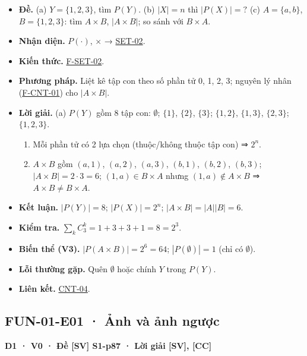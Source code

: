 \documentclass[
  10pt,
  twoside,openany]{book}
\providecommand{\tightlist}{%
  \setlength{\itemsep}{0pt}\setlength{\parskip}{0pt}}
\begin{document}
\begin{itemize}
\tightlist
\item
  \textbf{Đề.} (a) \(Y=\{1,2,3\}\), tìm \(P(Y)\). (b) \(|X|=n\) thì
  \(|P(X)|=?\) (c) \(A=\{a,b\}\), \(B=\{1,2,3\}\): tìm \(A\times B\),
  \(|A\times B|\); so sánh với \(B\times A\).
\item
  \textbf{Nhận diện.} \(P(\cdot)\), \(\times\) →
  \protect\hyperlink{SET-02}{SET-02}.
\item
  \textbf{Kiến thức.} \protect\hyperlink{F-SET-02}{F-SET-02}.
\item
  \textbf{Phương pháp.} Liệt kê tập con theo số phần tử 0, 1, 2, 3;
  nguyên lý nhân (\protect\hyperlink{F-CNT-01}{F-CNT-01}) cho
  \(|A\times B|\).
\item
  \textbf{Lời giải.} (a) \(P(Y)\) gồm 8 tập con: \(\emptyset\);
  \(\{1\}\), \(\{2\}\), \(\{3\}\); \(\{1,2\}\), \(\{1,3\}\),
  \(\{2,3\}\); \(\{1,2,3\}\).

  \begin{enumerate}
  \def\labelenumi{(\alph{enumi})}
  \setcounter{enumi}{1}
  \tightlist
  \item
    Mỗi phần tử có 2 lựa chọn (thuộc/không thuộc tập con) ⇒ \(2^n\).
  \item
    \(A\times B\) gồm \((a,1)\), \((a,2)\), \((a,3)\), \((b,1)\),
    \((b,2)\), \((b,3)\); \(|A\times B|=2\cdot3=6\);
    \((1,a)\in B\times A\) nhưng \((1,a)\notin A\times B\) ⇒
    \(A\times B\ne B\times A\).
  \end{enumerate}
\item
  \textbf{Kết luận.} \(|P(Y)|=8\); \(|P(X)|=2^n\);
  \(|A\times B|=|A||B|=6\).
\item
  \textbf{Kiểm tra.} \(\sum_k C_3^k=1+3+3+1=8=2^3\).
\item
  \textbf{Biến thể (V3).} \(|P(A\times B)|=2^{6}=64\);
  \(|P(\emptyset)|=1\) (chỉ có \(\emptyset\)).
\item
  \textbf{Lỗi thường gặp.} Quên \(\emptyset\) hoặc chính \(Y\) trong
  \(P(Y)\).
\item
  \textbf{Liên kết.} \protect\hyperlink{CNT-04}{CNT-04}.
\end{itemize}

\hypertarget{FUN-01-E01}{%
\subsection{FUN-01-E01 · Ảnh và ảnh ngược}\label{FUN-01-E01}}

\textbf{D1 · V0 · Đề {[}SV{]} S1-p87 · Lời giải {[}SV{]}, {[}CC{]}}
\end{document}
